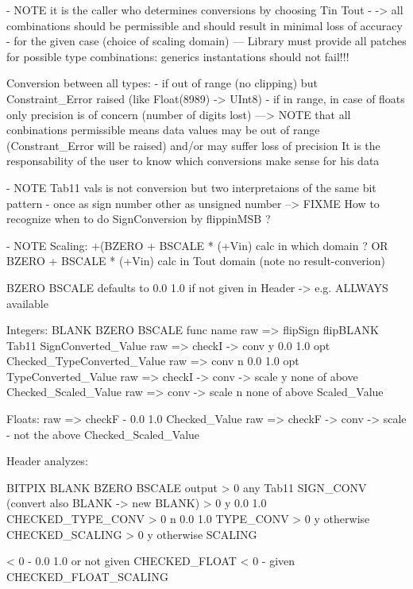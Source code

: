 
- NOTE it is the caller who determines conversions by choosing Tin Tout
- -> all combinations should be permissible and should result in minimal loss of accuracy
-    for the given case (choice of scaling domain)
--- Library must provide all patches for possible type combinations:
 generics instantations should not fail!!!

Conversion between all types:
- if out of range (no clipping) but Constraint_Error raised (like Float(8989) -> UInt8)
- if in range, in case of floats only precision is of concern (number of digits lost)
---> NOTE that all conbinations permissible means data values may be out of 
	range (Constrant_Error will be raised) and/or may suffer loss of precision 
	It is the responsability of the user to know  which conversions 
	make sense for his data


- NOTE Tab11 vals is not conversion but two interpretaions of the same bit pattern
- once as sign number other as unsigned number
--> FIXME How to recognize when to do SignConversion by flippinMSB ?

- NOTE Scaling:  
    +(BZERO + BSCALE * (+Vin)  calc in which domain ?
OR    BZERO + BSCALE * (+Vin)  calc in Tout domain (note no result-converion)




BZERO BSCALE defaults to 0.0 1.0 if not given in Header -> e.g. ALLWAYS available
				
Integers:			BLANK	BZERO BSCALE		func name
raw => flipSign		     flipBLANK	Tab11			SignConverted_Value
raw => checkI -> conv		  y	0.0 1.0  		opt Checked_TypeConverted_Value
raw => conv		  	  n	0.0 1.0  		opt TypeConverted_Value
raw => checkI -> conv -> scale	  y 	none of above		Checked_Scaled_Value
raw => conv -> scale		  n	none of above		Scaled_Value


Floats:
raw => checkF			  -	0.0 1.0			Checked_Value
raw => checkF -> conv -> scale	  -	not the above		Checked_Scaled_Value



Header analyzes:

BITPIX		BLANK	BZERO BSCALE		output
 > 0		 any	Tab11			SIGN_CONV (convert also BLANK -> new BLANK)
 > 0		  y	0.0 1.0			CHECKED_TYPE_CONV
 > 0		  n	0.0 1.0 		TYPE_CONV
 > 0		  y	otherwise		CHECKED_SCALING
 > 0		  y	otherwise		SCALING

 < 0		  -	0.0 1.0 or not given	CHECKED_FLOAT	
 < 0		  -	given			CHECKED_FLOAT_SCALING	

